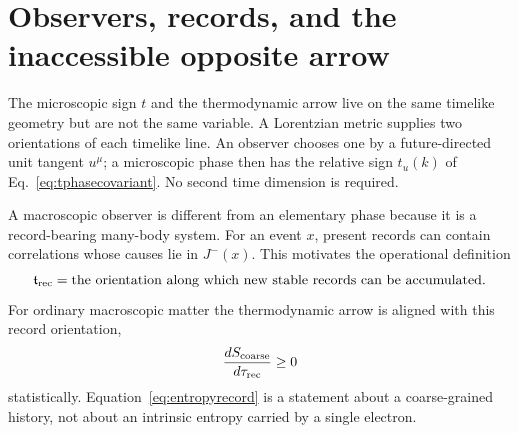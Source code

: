 \documentclass[11pt]{article}
\theoremstyle{definition}\newtheorem{definition}[theorem]{Definition}
\theoremstyle{remark}\newtheorem{remark}[theorem]{Remark}\newtheorem{conjecture}[theorem]{Conjecture}
\begin{document}
\section{Observers, records, and the inaccessible opposite arrow}
The microscopic sign $t$ and the thermodynamic arrow live on the same timelike geometry but are not the same variable. A Lorentzian metric supplies two orientations of each timelike line. An observer chooses one by a future-directed unit tangent $u^\mu$; a microscopic phase then has the relative sign $t_u(k)$ of Eq.~\eqref{eq:tphasecovariant}. No second time dimension is required.

A macroscopic observer is different from an elementary phase because it is a record-bearing many-body system. For an event $x$, present records can contain correlations whose causes lie in $J^-(x)$. This motivates the operational definition
\begin{equation}\label{eq:recordfuture}
 \mathfrak t_{\rm rec}=\hbox{the orientation along which new stable records can be accumulated}.
\end{equation}
For ordinary macroscopic matter the thermodynamic arrow is aligned with this record orientation,
\begin{equation}\label{eq:entropyrecord}
 \frac{dS_{\rm coarse}}{d\tau_{\rm rec}}\ge0
\end{equation}
statistically. Equation~\eqref{eq:entropyrecord} is a statement about a coarse-grained history, not about an intrinsic entropy carried by a single electron.
\end{document}
